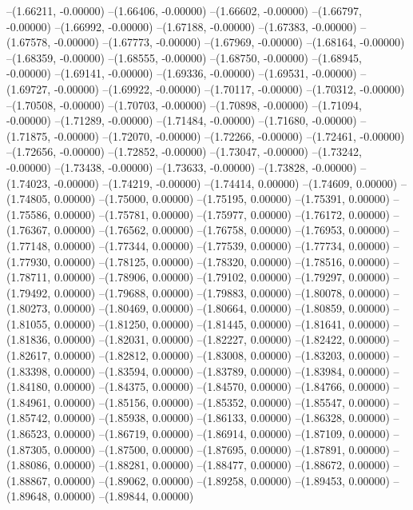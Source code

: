 --(1.66211, -0.00000)
--(1.66406, -0.00000)
--(1.66602, -0.00000)
--(1.66797, -0.00000)
--(1.66992, -0.00000)
--(1.67188, -0.00000)
--(1.67383, -0.00000)
--(1.67578, -0.00000)
--(1.67773, -0.00000)
--(1.67969, -0.00000)
--(1.68164, -0.00000)
--(1.68359, -0.00000)
--(1.68555, -0.00000)
--(1.68750, -0.00000)
--(1.68945, -0.00000)
--(1.69141, -0.00000)
--(1.69336, -0.00000)
--(1.69531, -0.00000)
--(1.69727, -0.00000)
--(1.69922, -0.00000)
--(1.70117, -0.00000)
--(1.70312, -0.00000)
--(1.70508, -0.00000)
--(1.70703, -0.00000)
--(1.70898, -0.00000)
--(1.71094, -0.00000)
--(1.71289, -0.00000)
--(1.71484, -0.00000)
--(1.71680, -0.00000)
--(1.71875, -0.00000)
--(1.72070, -0.00000)
--(1.72266, -0.00000)
--(1.72461, -0.00000)
--(1.72656, -0.00000)
--(1.72852, -0.00000)
--(1.73047, -0.00000)
--(1.73242, -0.00000)
--(1.73438, -0.00000)
--(1.73633, -0.00000)
--(1.73828, -0.00000)
--(1.74023, -0.00000)
--(1.74219, -0.00000)
--(1.74414, 0.00000)
--(1.74609, 0.00000)
--(1.74805, 0.00000)
--(1.75000, 0.00000)
--(1.75195, 0.00000)
--(1.75391, 0.00000)
--(1.75586, 0.00000)
--(1.75781, 0.00000)
--(1.75977, 0.00000)
--(1.76172, 0.00000)
--(1.76367, 0.00000)
--(1.76562, 0.00000)
--(1.76758, 0.00000)
--(1.76953, 0.00000)
--(1.77148, 0.00000)
--(1.77344, 0.00000)
--(1.77539, 0.00000)
--(1.77734, 0.00000)
--(1.77930, 0.00000)
--(1.78125, 0.00000)
--(1.78320, 0.00000)
--(1.78516, 0.00000)
--(1.78711, 0.00000)
--(1.78906, 0.00000)
--(1.79102, 0.00000)
--(1.79297, 0.00000)
--(1.79492, 0.00000)
--(1.79688, 0.00000)
--(1.79883, 0.00000)
--(1.80078, 0.00000)
--(1.80273, 0.00000)
--(1.80469, 0.00000)
--(1.80664, 0.00000)
--(1.80859, 0.00000)
--(1.81055, 0.00000)
--(1.81250, 0.00000)
--(1.81445, 0.00000)
--(1.81641, 0.00000)
--(1.81836, 0.00000)
--(1.82031, 0.00000)
--(1.82227, 0.00000)
--(1.82422, 0.00000)
--(1.82617, 0.00000)
--(1.82812, 0.00000)
--(1.83008, 0.00000)
--(1.83203, 0.00000)
--(1.83398, 0.00000)
--(1.83594, 0.00000)
--(1.83789, 0.00000)
--(1.83984, 0.00000)
--(1.84180, 0.00000)
--(1.84375, 0.00000)
--(1.84570, 0.00000)
--(1.84766, 0.00000)
--(1.84961, 0.00000)
--(1.85156, 0.00000)
--(1.85352, 0.00000)
--(1.85547, 0.00000)
--(1.85742, 0.00000)
--(1.85938, 0.00000)
--(1.86133, 0.00000)
--(1.86328, 0.00000)
--(1.86523, 0.00000)
--(1.86719, 0.00000)
--(1.86914, 0.00000)
--(1.87109, 0.00000)
--(1.87305, 0.00000)
--(1.87500, 0.00000)
--(1.87695, 0.00000)
--(1.87891, 0.00000)
--(1.88086, 0.00000)
--(1.88281, 0.00000)
--(1.88477, 0.00000)
--(1.88672, 0.00000)
--(1.88867, 0.00000)
--(1.89062, 0.00000)
--(1.89258, 0.00000)
--(1.89453, 0.00000)
--(1.89648, 0.00000)
--(1.89844, 0.00000)
